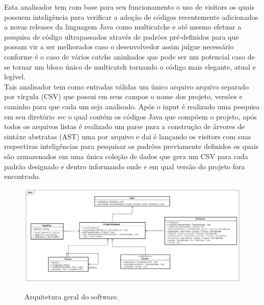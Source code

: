 Esta analisador tem com base para seu funcionamento o uso de visitors\cite{Gamma:1995:DPE:186897} os quais possuem inteligência para verificar a adoção de códigos recentemente adicionados a novas releases da linguagem Java como multicatchs e até mesmo efetuar a pesquisa de código ultrapassados através de padrões pré-definidos para que possam vir a ser melhorados caso o desenvolvedor assim julgue necessário conforme é o caso de vários catchs aninhados que pode ser um potencial caso de se tornar um bloco único de multicatch tornando o código mais elegante, atual e legível.\\

Tais analisador tem como entradas válidas um único arquivo arquivo separado por vírgula (CSV) que possui em seus campos o nome dos projeto, versões e caminho para que cada um seja analisado. Após o input é realizado uma pesquisa em seu diretório \textit{src} o qual contém os códigos Java que compõem o projeto, após todos os arquivos listas é realizado um parse para a construção de árvores de sintáxe abstratas (AST) uma por arquivo e dai é lançando os visitors\cite{Gamma:1995:DPE:186897} com suas respectivas inteligências para pesquisar os padrões previamente definidos os quais são armazenados em uma única coleção de dados que gera um CSV para cada padrão designado e dentro informando onde e em qual versão do projeto fora encontrado.\\
	
\begin{figure}[h]
	\center
	\includegraphics[width=1.0\textwidth]{Imagens/Arquitetura}
	\label{arquiteturaVisitor}
	\caption{Arquitetura geral do software.}
\end{figure}	

\clearpage
